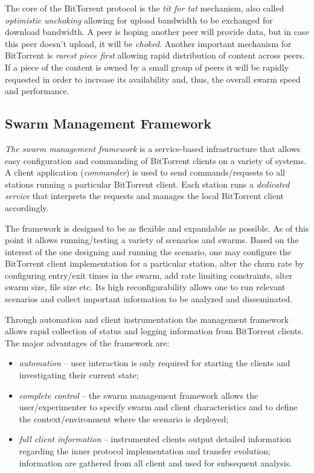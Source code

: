 The core of the BitTorrent protocol is the \textit{tit for tat} mechanism,
also called \textit{optimistic unchoking} allowing for upload bandwidth to be
exchanged for download bandwidth. A peer is hoping another peer will provide
data, but in case this peer doesn't upload, it will be \textit{choked}.
Another important mechanism for BitTorrent is \textit{rarest piece first}
allowing rapid distribution of content across peers. If a piece of the content
is owned by a small group of peers it will be rapidly requested in order to
increase its availability and, thus, the overall swarm speed and performance.

\subsection{Swarm Management Framework}

\textit{The swarm management framework} is a service-based infrastructure that
allows easy configuration and commanding of BitTorrent clients on a variety of
systems. A client application (\textit{commander}) is used to send
commands/requests to all stations running a particular BitTorrent client. Each
station runs a \textit{dedicated service} that interprets the requests and
manages the local BitTorrent client accordingly.

The framework is designed to be as flexible and expandable as possible. As of
this point it allows running/testing a variety of scenarios and swarms. Based
on the interest of the one designing and running the scenario, one may
configure the BitTorrent client implementation for a particular station, alter
the churn rate by configuring entry/exit times in the swarm, add rate limiting
constraints, alter swarm size, file size etc. Its high reconfigurability allows
one to run relevant scenarios and collect important information to be analyzed
and disseminated.

Through automation and client instrumentation the management framework allows
rapid collection of status and logging information from BitTorrent clients.
The major advantages of the framework are:
\begin{itemize}
  \item \textit{automation} -- user interaction is only required for starting the
clients and investigating their current state;
  \item \textit{complete control} -- the swarm management framework allows the
user/experimenter to specify swarm and client characteristics and to define
the context/environment where the scenario is deployed;
  \item \textit{full client information} -- instrumented clients output detailed
information regarding the inner protocol implementation and transfer
evolution; information are gathered from all client and used for subsequent
analysis.
\end{itemize}


